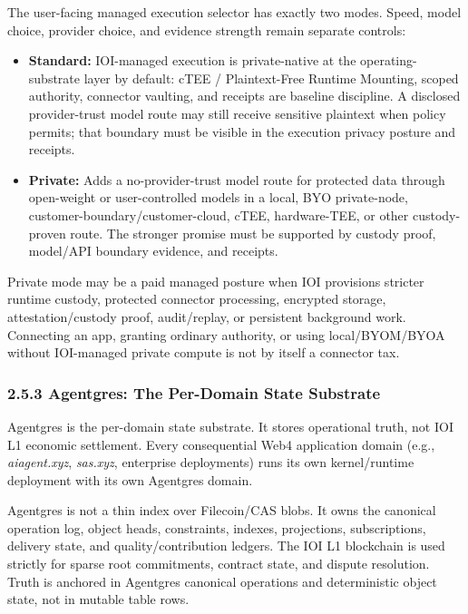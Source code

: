 \documentclass[
  11pt,
]{article}
\providecommand{\tightlist}{%
  \setlength{\itemsep}{0pt}\setlength{\parskip}{0pt}}
\begin{document}
The user-facing managed execution selector has exactly two modes. Speed,
model choice, provider choice, and evidence strength remain separate
controls:

\begin{itemize}
\tightlist
\item
  \textbf{Standard:} IOI-managed execution is private-native at the
  operating-substrate layer by default: cTEE / Plaintext-Free Runtime
  Mounting, scoped authority, connector vaulting, and receipts are baseline
  discipline. A disclosed provider-trust model route may still receive
  sensitive plaintext when policy permits; that boundary must be visible in
  the execution privacy posture and receipts.
\item
  \textbf{Private:} Adds a no-provider-trust model route for protected
  data through open-weight or user-controlled models in a local, BYO
  private-node, customer-boundary/customer-cloud, cTEE, hardware-TEE, or
  other custody-proven route. The stronger promise must be supported by
  custody proof, model/API boundary evidence, and receipts.
\end{itemize}

Private mode may be a paid managed posture when IOI provisions stricter
runtime custody, protected connector processing, encrypted storage,
attestation/custody proof, audit/replay, or persistent background work.
Connecting an app, granting ordinary authority, or using local/BYOM/BYOA
without IOI-managed private compute is not by itself a connector tax.

\hypertarget{agentgres-the-per-domain-state-substrate}{%
\subsubsection{2.5.3 Agentgres: The Per-Domain State
Substrate}\label{agentgres-the-per-domain-state-substrate}}

Agentgres is the per-domain state substrate. It stores operational
truth, not IOI L1 economic settlement. Every consequential Web4
application domain (e.g., \emph{aiagent.xyz}, \emph{sas.xyz}, enterprise
deployments) runs its own kernel/runtime deployment with its own
Agentgres domain.

Agentgres is not a thin index over Filecoin/CAS blobs. It owns the
canonical operation log, object heads, constraints, indexes,
projections, subscriptions, delivery state, and quality/contribution
ledgers. The IOI L1 blockchain is used strictly for sparse root
commitments, contract state, and dispute resolution. Truth is anchored
in Agentgres canonical operations and deterministic object state, not in
mutable table rows.
\end{document}
